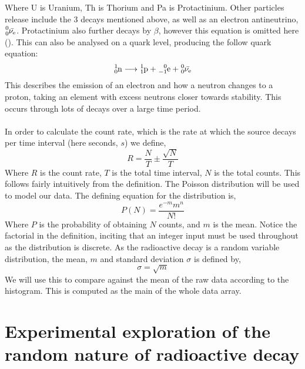 \documentclass[11pt]{article}
\begin{document}
   Where U is Uranium, Th is Thorium and Pa is Protactinium. Other particles release include the 3 decays mentioned above, as well as an electron antineutrino,$\ce{^{0}_{0}\bar{\nu_{e}}}$. Protactinium also further decays by $\beta$, however this equation is omitted here (\cite{arazo2016uranium}). This can also be analysed on a quark level, producing the follow quark equation:
 \newline
  \begin{equation} \ce{^{1}_{0}n} \longrightarrow \ce{^{1}_{1}p} + \ce{^{0}_{-1}e} + \ce{^{0}_{0}\bar{\nu_{e}}} 
  \end{equation}
\newline
This describes the emission of an electron and how a neutron changes to a proton, taking an element with excess neutrons closer towards stability. This occurs through lots of decays over a large time period. 
   \\
   \\
   In order to calculate the count rate, which is the rate at which the source decays per time interval (here seconds, $s$)  we define, 
  \begin{equation} 
  R = \frac{N}{T} \pm \frac{\sqrt{N}}{T}
   \end{equation}
   Where $R$ is the count rate, $T$ is the total time interval, $N$ is the total counts. This follows fairly intuitively from the definition. 
    The Poisson distribution will be used to model our data. The defining equation for the distribution is, 
    \begin{equation}
        P(N) = \frac{e^{-m}m^{n}}{N!}
    \end{equation}
    Where $P$ is the probability of obtaining $N$ counts, and $m$ is the mean. Notice the factorial in the definition, inciting that an integer input must be used throughout as the distribution is discrete. 
    As the radioactive decay is a random variable distribution, the mean, $m$ and standard deviation $\sigma$ is defined by,
    \begin{equation}
        \sigma = \sqrt{m}
    \end{equation}
    We will use this to compare against the mean of the raw data according to the histogram. This is computed as the main of the whole data array. 
     \newline 
    \section{Experimental exploration of the random nature of radioactive decay}
\end{document}
